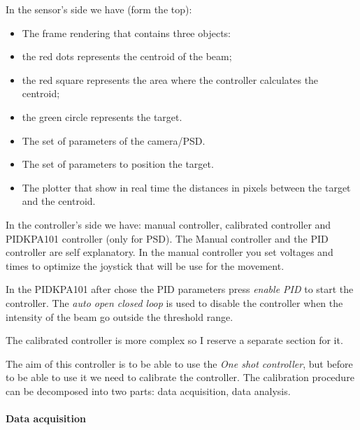 In the sensor's side we have (form the top):

\begin{itemize}
      \itemsep1pt\parskip0pt
      \item
            The frame rendering that contains three objects:
      \item
            the red dots represents the centroid of the beam;
      \item
            the red square represents the area where the controller calculates the
            centroid;
      \item
            the green circle represents the target.
      \item
            The set of parameters of the camera/PSD.
      \item
            The set of parameters to position the target.
      \item
            The plotter that show in real time the distances in pixels between the
            target and the centroid.
\end{itemize}

In the controller's side we have: manual controller, calibrated
controller and PIDKPA101 controller (only for PSD). The Manual
controller and the PID controller are self explanatory. In the manual
controller you set voltages and times to optimize the joystick that will
be use for the movement.

In the PIDKPA101 after chose the PID parameters press \emph{enable PID}
to start the controller. The \emph{auto open closed loop} is used to
disable the controller when the intensity of the beam go outside the
threshold range.

The calibrated controller is more complex so I reserve a separate
section for it.



The aim of this controller is to be able to use the \emph{One shot
      controller}, but before to be able to use it we need to calibrate the
controller. The calibration procedure can be decomposed into two parts:
data acquisition, data analysis.

\paragraph{Data acquisition}

